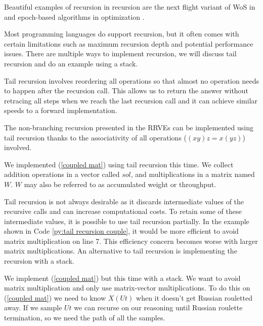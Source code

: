 \documentclass[a4paper,12pt]{article}
\begin{document}
\begin{related}
    Beautiful examples of recursion in recursion are
    the next flight variant of WoS in
    \cite{sawhney_grid-free_2022} and epoch-based algorithms in optimization
    \cite{gupta_convergence_2021}.
\end{related}

Most programming languages do support recursion, but it often comes with certain
limitations such as maximum recursion depth and potential performance issues.
There are multiple ways to implement recursion, we will discuss tail recursion and
do an example using a stack.

\begin{technique}
    Tail recursion involves reordering all operations
    so that almost no operation needs to happen after
    the recursion call. This allows us to return the
    answer without retracing all steps when we reach
    the last recursion call and it can achieve similar
    speeds to a forward implementation.
\end{technique}

The non-branching recursion presented in the RRVEs can
be implemented using tail recursion thanks to the associativity
of all operations ($(xy)z = x(yz)$) involved.

\begin{pythonn} \label{py:tail recursion couple}
    We implemented (\ref{coupled mat}) using tail recursion this time. We
    collect addition operations in a vector called $sol$, and multiplications
    in a matrix named $W$. $W$ may also be referred to as accumulated weight
    or throughput.
    \vspace{0.3cm}
\end{pythonn}

Tail recursion is not always desirable as it discards intermediate values
of the recursive calls and can increase computational costs. To retain
some of these intermediate values, it is possible to use tail recursion partially.
In the example shown in Code \ref{py:tail recursion couple}, it would be more efficient
to avoid matrix multiplication on line 7. This efficiency concern becomes
worse with larger matrix multiplications. An alternative to tail recursion is implementing
the recursion with a stack.

\begin{pythonn} \label{py:stack recursion couple}
    We implement (\ref{coupled mat}) but this time with a stack.
    We want to avoid matrix multiplication and only use matrix-vector multiplications.
    To do this on (\ref{coupled mat}) we need to know $X(Ut)$ when
    it doesn't get Russian rouletted away. If we sample $Ut$ we can recurse
    on our reasoning until Russian roulette termination, so we need the path
    of all the samples.
    \vspace{0.3cm}
\end{pythonn}
\end{document}
